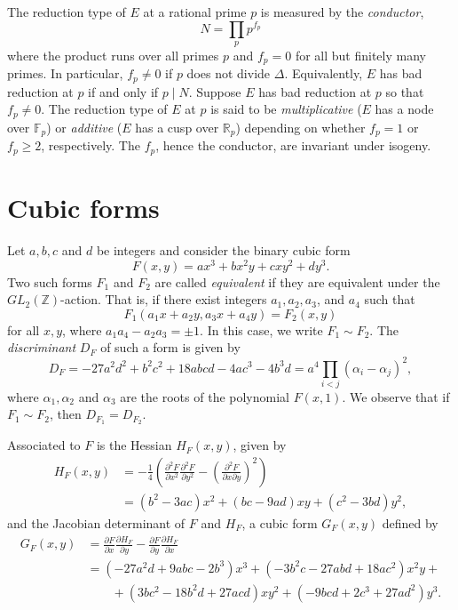 The reduction type of $E$ at a rational prime $p$ is measured by the \textit{conductor}, 
\[N = \prod_{p}p^{f_p}\]
where the product runs over all primes $p$ and $f_p = 0$ for all but finitely many primes. In particular, $f_p \neq 0$ if $p$ does not divide $\Delta$. Equivalently, $E$ has bad reduction at $p$ if and only if $p \mid N$. Suppose $E$ has bad reduction at $p$ so that $f_p \neq 0$. The reduction type of $E$ at $p$ is said to be \textit{multiplicative} ($E$ has a node over $\mathbb{F}_p$) or \textit{additive} ($E$ has a cusp over $\mathbb{R}_p$) depending on whether $f_p = 1$ or $f_p \geq 2$, respectively. The $f_p$, hence the conductor, are invariant under isogeny. 


\section{Cubic forms}
\label{sec:CubicForms}

Let $a,b,c$ and $d$ be integers and consider the binary cubic form
\[F(x,y) = ax^3 + bx^2y + cxy^2 + dy^3.\]
Two such forms $F_1$ and $F_2$ are called \textit{equivalent} if they are equivalent under the $GL_{2}(\mathbb{Z})$-action. That is, if there exist integers $a_1, a_2, a_3$, and $a_4$ such that 
\[F_1(a_1x + a_2y, a_3x + a_4y) = F_2(x,y)\]
for all $x,y$, where $a_1a_4 - a_2a_3 = \pm 1$. In this case, we write $F_1 \sim F_2$. The \textit{discriminant} $D_F$ of such a form is given by 
\[D_F = -27a^2d^2 + b^2c^2 + 18abcd - 4ac^3 - 4b^3d = a^4 \prod_{i < j} (\alpha_i - \alpha_j)^2,\]
where $\alpha_1, \alpha_2$ and $\alpha_3$ are the roots of the polynomial $F(x,1)$. We observe that if $F_1 \sim F_2$, then $D_{F_1} = D_{F_2}$. 

Associated to $F$ is the Hessian $H_F(x,y)$, given by
\begin{align*}
H_F(x,y) & = -\frac{1}{4}\left( \frac{\partial^2F}{\partial x^2} \frac{\partial^2F}{\partial y^2} - \left(\frac{\partial^2F}{\partial x \partial y}\right)^2\right)\\
& = (b^2 - 3ac)x^2 + (bc - 9ad)xy + (c^2 - 3bd)y^2,
\end{align*}
and the Jacobian determinant of $F$ and $H_F$, a cubic form $G_F(x,y)$ defined by
\begin{align*}
G_F(x,y) &= \frac{\partial F}{\partial x} \frac{\partial H_F}{\partial y} - \frac{\partial F}{\partial y} \frac{\partial H_F}{\partial x} \\
& =  (-27a^2d + 9abc -2b^3)x^3 + (-3b^2c - 27abd + 18ac^2)x^2y +  \\
& \quad \quad + (3bc^2 - 18b^2d + 27acd)xy^2 + (-9bcd + 2c^3 + 27ad^2)y^3.
\end{align*}

